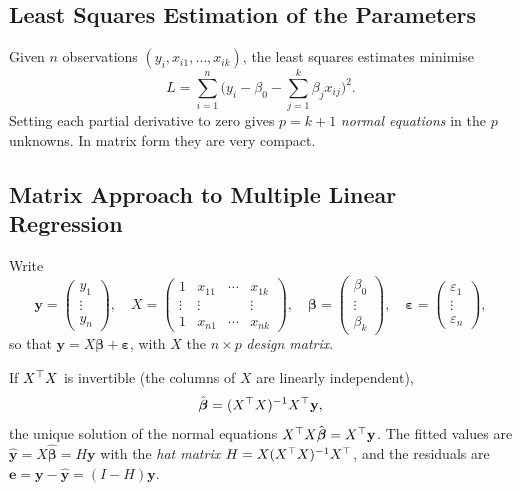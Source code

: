 \subsection{Least Squares Estimation of the Parameters}

Given $n$ observations $(y_i,x_{i1},\dots,x_{ik})$, the least squares estimates minimise
\[ L=\sum_{i=1}^n\Big(y_i-\beta_0-\sum_{j=1}^k\beta_jx_{ij}\Big)^2. \]
Setting each partial derivative to zero gives $p=k+1$ \emph{normal equations} in the $p$ unknowns. In matrix form they are very compact.

\subsection{Matrix Approach to Multiple Linear Regression}

Write
\[ \mathbf{y}=\begin{pmatrix}y_1\\\vdots\\y_n\end{pmatrix},\quad X=\begin{pmatrix}1&x_{11}&\cdots&x_{1k}\\\vdots&\vdots&&\vdots\\1&x_{n1}&\cdots&x_{nk}\end{pmatrix},\quad\boldsymbol\beta=\begin{pmatrix}\beta_0\\\vdots\\\beta_k\end{pmatrix},\quad\boldsymbol\varepsilon=\begin{pmatrix}\varepsilon_1\\\vdots\\\varepsilon_n\end{pmatrix}, \]
so that $\mathbf{y}=X\boldsymbol\beta+\boldsymbol\varepsilon$, with $X$ the $n\times p$ \emph{design matrix}.

\begin{theorem}\label{thm:mlr-ls}
If $X^{\top} X$ is invertible (the columns of $X$ are linearly independent),
\[ \hat{\boldsymbol\beta}=(X^{\top} X)^{-1}X^{\top}\mathbf{y}, \]
the unique solution of the normal equations $X^{\top} X\hat{\boldsymbol\beta}=X^{\top}\mathbf{y}$. The fitted values are $\hat{\mathbf{y}}=X\hat{\boldsymbol\beta}=H\mathbf{y}$ with the \emph{hat matrix} $H=X(X^{\top} X)^{-1}X^{\top}$, and the residuals are $\mathbf{e}=\mathbf{y}-\hat{\mathbf{y}}=(I-H)\mathbf{y}$.
\end{theorem}

